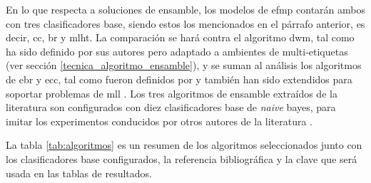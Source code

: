 En lo que respecta a soluciones de ensamble, los modelos de \acrshort{efmp}
contarán ambos con tres clasificadores base, siendo estos los mencionados en el
párrafo anterior, es decir, \acrshort{cc}, \acrshort{br} y \acrshort{mlht}. La
comparación se hará contra el algoritmo \acrfull{dwm}, tal como ha sido definido
por sus autores \cite{kolter_dynamic_2007} pero adaptado a ambientes de
multi-etiquetas (ver sección \ref{tecnica_algoritmo_ensamble}), y se suman al
análisis los algoritmos de \acrfull{ebr} y \acrfull{ecc}, tal como fueron
definidos por \citeauthor{oza_online_2005} \cite{oza_online_2005} y también han
sido extendidos para soportar problemas de \acrshort{mll}
\cite{read_classifier_2011}. Los tres algoritmos de ensamble extraídos de la
literatura son configurados con diez clasificadores base de \textit{naive}
bayes, para imitar los experimentos conducidos por otros autores de la
literatura \cite{osojnik_multi-label_2017, read_scalable_2012,
	buyukcakir_novel_2018}.

La tabla \ref{tab:algoritmos} es un resumen de los algoritmos seleccionados
junto con los clasificadores base configurados, la referencia bibliográfica y la
clave que será usada en las tablas de resultados.

